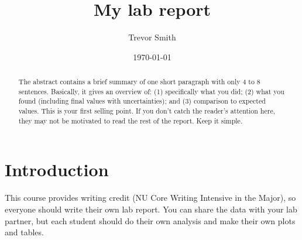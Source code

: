 \documentclass[aps,prl,reprint]{revtex4-2}
\begin{document}

\title{My lab report}


\author{Trevor Smith}


\date{\today}

\begin{abstract}
The abstract contains a brief summary of one short paragraph with only 4 to 8 sentences. Basically, it gives an overview of: (1) specifically what you did; (2) what you found (including final values with uncertainties); and (3) comparison to expected values. This is your first selling point. If you don’t catch the reader’s attention here, they may not be motivated to read the rest of the report. Keep it simple.
\end{abstract}


\maketitle

\section{Introduction}

This course provides writing credit (NU Core Writing Intensive in the Major), so everyone should write their own lab report. You can share the data with your lab partner, but each student should do their own analysis and make their own plots and tables.
\end{document}
